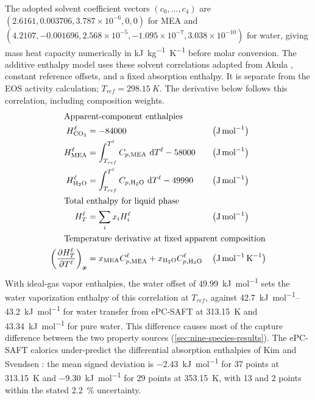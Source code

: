 The adopted solvent coefficient vectors $(c_0,\ldots,c_4)$ are $(2.6161,0.003706,3.787\times10^{-6},0,0)$ for MEA and $(4.2107,-0.001696,2.568\times10^{-5},-1.095\times10^{-7},3.038\times10^{-10})$ for water, giving mass heat capacity numerically in \unit{kJ.kg^{-1}.K^{-1}} before molar conversion.
The additive enthalpy model uses these solvent correlations adapted from Akula \cite{Akula2023}, constant reference offsets, and a fixed \COtwo{} absorption enthalpy.
It is separate from the EOS activity calculation; $T_{ref}=\qty{298.15}{K}$.
The derivative below follows this correlation, including composition weights.
\begin{align}
\shortintertext{\quad\; Apparent-component enthalpies}
H^{\liq}_{\COtwo} &= -84000
&& \left(\unit{J\,mol^{-1}}\right)\\
H^{\liq}_{\MEA} &= \int_{T_{ref}}^{T^{\liq}} C_{p,\MEA} \,\differential T^{\liq} - 58000
&& \left(\unit{J\,mol^{-1}}\right)\\
H^{\liq}_{\HtwoO} &= \int_{T_{ref}}^{T^{\liq}} C_{p,\HtwoO} \,\differential T^{\liq} - 49990
&& \left(\unit{J\,mol^{-1}}\right)\\
\shortintertext{\quad\; Total enthalpy for liquid phase}
H^{\liq}_{T} &= \sum_{i} x_iH^{\liq}_{i}
&& \left(\unit{J\,mol^{-1}}\right)\\
\shortintertext{\quad\; Temperature derivative at fixed apparent composition}
\left(\pdv{H^{\liq}_{T}}{T^{\liq}}\right)_{\boldsymbol{x}} &= x_{\MEA} C^{\liq}_{p,\MEA} + x_{\HtwoO} C^{\liq}_{p,\HtwoO}
&& \left(\unit{J\,mol^{-1}\,K^{-1}}\right)
\end{align}
With ideal-gas vapor enthalpies, the water offset of \qty{49.99}{kJ.mol^{-1}} sets the water vaporization enthalpy of this correlation at $T_{ref}$, against \qtyrange{42.7}{43.2}{kJ.mol^{-1}} for water transfer from ePC-SAFT at \qty{313.15}{K} and \qty{43.34}{kJ.mol^{-1}} for pure water.
This difference causes most of the capture difference between the two property sources (\cref{sec:nine-species-results}).
The ePC-SAFT calorics under-predict the differential \COtwo{} absorption enthalpies of Kim and Svendsen \cite{Kim2007}: the mean signed deviation is \qty{-2.43}{kJ.mol^{-1}} for 37 points at \qty{313.15}{K} and \qty{-9.30}{kJ.mol^{-1}} for 29 points at \qty{353.15}{K}, with 13 and 2 points within the stated \qty{2.2}{\percent} uncertainty.



